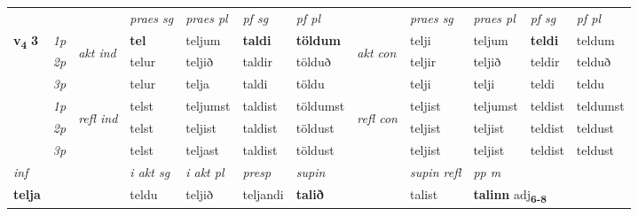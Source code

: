 \begin{longtable}[l]{X>{\footnotesize\itshape}llXXXXlXXXX}
 & &   & \textit{praes sg}  & \textit{praes pl}    & \textit{ pf sg} & \textit{pf pl} & & \textit{praes sg}  & \textit{praes pl}    & \textit{pf sg} & \textit{pf pl }  \\ \cmidrule{4-7} \cmidrule{9-12}
 \multirow{2}{*}{{{\textbf{v{\textsubscript{4}}} \Large{\textbf{3}}}}}  & 1p & \multirow{3}{*}{\begin{turn}{90}\textit{akt ind}\end{turn}} & \textbf{tel} & teljum & \textbf{taldi} & \textbf{töldum} & \multirow{3}{*}{\begin{turn}{90}\textit{akt con}\end{turn}} &telji & teljum & \textbf{teldi} & teldum\\*
 & 2p &  &  telur  & teljið & taldir & tölduð & & teljir & teljið & teldir & telduð \\*
 & 3p &  & telur & telja & taldi & töldu & & telji & telji& teldi & teldu \\*
\cmidrule{4-7} \cmidrule{9-12}
 & 1p & \multirow{3}{*}{\begin{turn}{90}\textit{refl ind}\end{turn}}  & telst & teljumst & taldist & töldumst & \multirow{3}{*}{\begin{turn}{90}\textit{refl con}\end{turn}}  &teljist & teljumst & teldist & teldumst \\*
 & 2p &  & telst & teljist & taldist & töldust & &teljist & teljist & teldist & teldust \\*
 & 3p  & & telst & teljast & taldist & töldust & & teljist & teljist& teldist & teldust \\*
\cmidrule{4-7} \cmidrule{9-12}

   {\textit{inf}} & &  & \textit{i akt sg} & \textit{i akt pl}   & \textit{presp} & \textit{supin} && \textit{supin refl} & \textit{pp m} \\*
  {\textbf{telja}} & && teldu  & teljið   & teljandi &  \textbf{talið} && talist & \multicolumn{2}{l}{\textbf{talinn} adj\textbf{\textsubscript{6-8}}} \\*

\midrule


\end{longtable}
